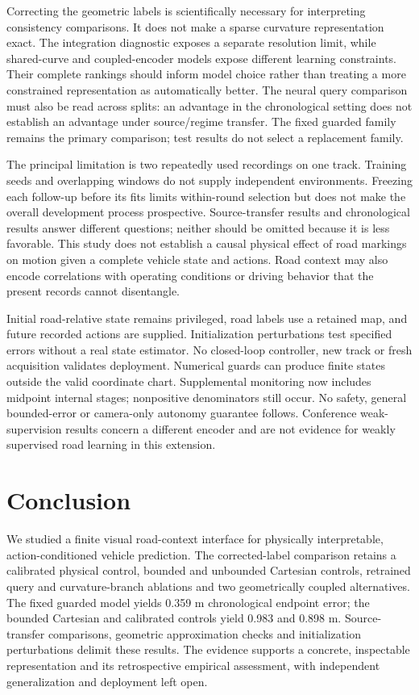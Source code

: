 \documentclass[preprint,12pt]{elsarticle}
\begin{document}
Correcting the geometric labels is scientifically necessary for interpreting
consistency comparisons. It does not make a sparse curvature representation
exact. The integration diagnostic exposes a separate resolution limit, while
shared-curve and coupled-encoder models expose different learning constraints.
Their complete rankings should inform model choice rather than treating a more
constrained representation as automatically better. The neural query comparison must also be read across splits: an advantage in
the chronological setting does not establish an advantage under source/regime
transfer. The fixed guarded family remains the primary comparison; test results
do not select a replacement family.

The principal limitation is two repeatedly used recordings on one track.
Training seeds and overlapping windows do not supply independent environments.
Freezing each follow-up before its fits limits within-round selection but does
not make the overall development process prospective. Source-transfer results
and chronological results answer different questions; neither should be omitted
because it is less favorable. This study does not establish a causal physical
effect of road markings on motion given a complete vehicle state and actions.
Road context may also encode correlations with operating conditions or driving
behavior that the present records cannot disentangle.

Initial road-relative state remains privileged, road labels use a retained map,
and future recorded actions are supplied. Initialization perturbations test
specified errors without a real state estimator. No closed-loop controller,
new track or fresh acquisition validates deployment. Numerical guards can
produce finite states outside the valid coordinate chart. Supplemental monitoring
now includes midpoint internal stages; nonpositive denominators still occur. No safety,
general bounded-error or camera-only autonomy guarantee follows. Conference
weak-supervision results concern a different encoder and are not evidence for
weakly supervised road learning in this extension.

\section{Conclusion}\label{sec:conclusion}
We studied a finite visual road-context interface for physically interpretable,
action-conditioned vehicle prediction. The corrected-label comparison retains
a calibrated physical control, bounded and unbounded Cartesian controls,
retrained query and curvature-branch ablations and two geometrically coupled alternatives.
The fixed guarded model yields 0.359 m chronological endpoint error; the bounded Cartesian and calibrated controls yield 0.983 and 0.898 m. Source-transfer comparisons, geometric approximation checks and initialization
perturbations delimit these results. The evidence supports a concrete,
inspectable representation and its retrospective empirical assessment, with
independent generalization and deployment left open.
\end{document}
